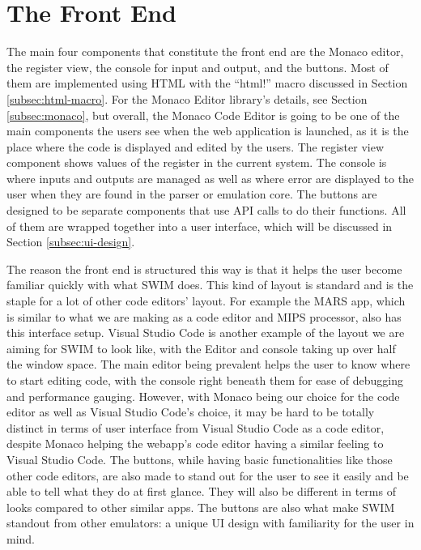 \documentclass[
    paper=letter,
    parskip=half,
    fontsize=12pt,
    titlepage=firstiscover,
    toc=bibliography,
    numbers=endperiod
]{scrartcl}
\let\oldsection\section
\renewcommand{\section}{\newpage\oldsection}
\begin{document}
\section{The Front End}
\label{sec:front-end}

The main four components that constitute the front end are the Monaco
editor, the register view, the console for input and output, and the buttons.
Most of them are implemented using HTML with the ``html!'' macro
discussed in Section \ref{subsec:html-macro}. For the Monaco Editor library's details,
see Section \ref{subsec:monaco}, but overall, the Monaco Code Editor is going to be one
of the main components the users see when the web application is launched, as it
is the place where the code is displayed and edited by the users. The
register view component shows values of the register in the current
system. The console is where inputs and outputs are managed as well as
where error are displayed to the user when they are found in the parser or emulation core. The buttons are
designed to be separate components that use API calls to do their
functions. All of them are wrapped together into a user interface, which
will be discussed in Section \ref{subsec:ui-design}.

The reason the front end is structured this way is that it helps the
user become familiar quickly with what SWIM does. This kind of layout is
standard and is the staple for a lot of other code editors' layout. For
example the MARS app, which is similar to what we are making as a code
editor and MIPS processor, also has this interface setup. Visual Studio
Code is another example of the layout we are aiming for SWIM to look
like, with the Editor and console taking up over half the window space.
The main editor being prevalent helps the user to know where to start
editing code, with the console right beneath them for ease of debugging
and performance gauging. However, with Monaco being our choice for the
code editor as well as Visual Studio Code's choice, it may be hard to be
totally distinct in terms of user interface from Visual Studio Code as a
code editor, despite Monaco helping the webapp's code editor having a
similar feeling to Visual Studio Code. The buttons, while having basic
functionalities like those other code editors, are also made to stand
out for the user to see it easily and be able to tell what they do at
first glance. They will also be different in terms of looks compared to
other similar apps. The
buttons are also what make SWIM standout from other emulators: a unique
UI design with familiarity for the user in mind.
\end{document}
